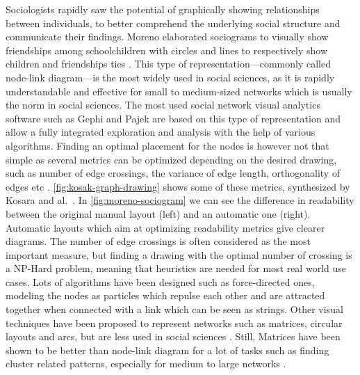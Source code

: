 Sociologists rapidly saw the potential of graphically showing relationships between individuals, to better comprehend the underlying social structure and communicate their findings.
Moreno elaborated sociograms to visually show friendships among schoolchildren with circles and lines to respectively show children and friendships ties \cite{morenoWhoShallSurvive1934}.
This type of representation---commonly called node-link diagram---is the most widely used in social sciences, as it is rapidly understandable and effective for small to medium-sized networks which is usually the norm in social sciences.
The most used social network visual analytics software such as Gephi \cite{Gephi} and Pajek \cite{batagelj_pajek_nodate} are based on this type of representation and allow a fully integrated exploration and analysis with the help of various algorithms.
Finding an optimal placement for the nodes is however not that simple as several metrics can be optimized depending on the desired drawing, such as number of edge crossings, the variance of edge length, orthogonality of edges etc \cite{cristofoliPrincipesUsagesDessins, kosakAutomatingLayoutNetwork1994}. \autoref{fig:kosak-graph-drawing} shows some of these metrics, synthesized by Kosara and al.\ \cite{kosakAutomatingLayoutNetwork1994}.
In \autoref{fig:moreno-sociogram} we can see the difference in readability between the original manual layout (left) and an automatic one (right).
Automatic layouts which aim at optimizing readability metrics give clearer diagrams.
The number of edge crossings is often considered as the most important measure, but finding a drawing with the optimal number of crossing is a NP-Hard problem, meaning that heuristics are needed for most real world use cases.
Lots of algorithms have been designed such as force-directed ones, modeling the nodes as particles which repulse each other and are attracted together when connected with a link which can be seen as strings.
Other visual techniques have been proposed to represent networks such as matrices, circular layouts and arcs, but are less used in social sciences \cite{mcguffinSimpleAlgorithmsNetwork2012}.
Still, Matrices have been shown to be better than node-link diagram for a lot of tasks such as finding cluster related patterns, especially for medium to large networks \cite{ghoniemComparisonReadabilityGraphs2004}.

